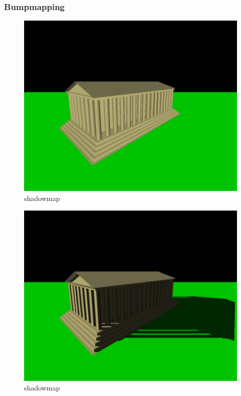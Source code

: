 \subsubsection{Bumpmapping}
\begin{figure}[H]
    \centering
    \includegraphics[width=1.0\textwidth]{images/sm_ns.png}
    \caption{shadowmap} %
    \label{fig:shadowmap1}
\end{figure}

\begin{figure}[H]
    \centering
    \includegraphics[width=1.0\textwidth]{images/sm_ws.png}
    \caption{shadowmap} %
    \label{fig:shadowmap2}
\end{figure}

